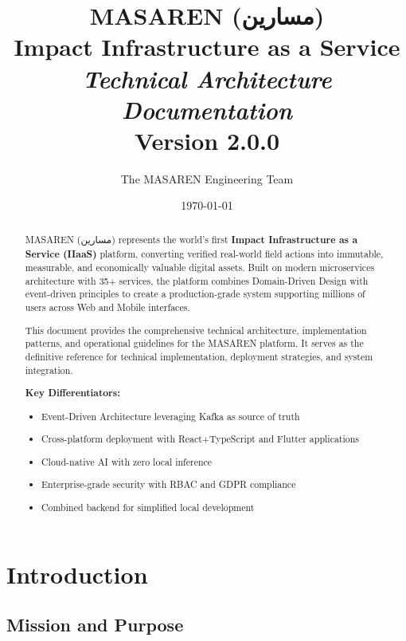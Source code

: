 \documentclass[11pt,a4paper]{article}
\title{\Huge \textbf{MASAREN (مسارين)} \\[4pt]
       \Large Impact Infrastructure as a Service \\[8pt]
       \large \textit{Technical Architecture Documentation} \\[4pt]
       \normalsize Version 2.0.0}
\author{The MASAREN Engineering Team}
\date{\today}
\begin{document}
\maketitle

\begin{center}
\end{center}

\vfill
\begin{abstract}
MASAREN (مسارين) represents the world's first \textbf{Impact Infrastructure as a Service (IIaaS)} platform, converting verified real-world field actions into immutable, measurable, and economically valuable digital assets. Built on modern microservices architecture with 35+ services, the platform combines Domain-Driven Design with event-driven principles to create a production-grade system supporting millions of users across Web and Mobile interfaces.

This document provides the comprehensive technical architecture, implementation patterns, and operational guidelines for the MASAREN platform. It serves as the definitive reference for technical implementation, deployment strategies, and system integration.

\textbf{Key Differentiators:}
\begin{itemize}
  \item Event-Driven Architecture leveraging Kafka as source of truth
  \item Cross-platform deployment with React+TypeScript and Flutter applications
  \item Cloud-native AI with zero local inference
  \item Enterprise-grade security with RBAC and GDPR compliance
  \item Combined backend for simplified local development
\end{itemize}
\end{abstract}
\clearpage

\tableofcontents
\clearpage

\section{Introduction}

\subsection{Mission and Purpose}
\end{document}
